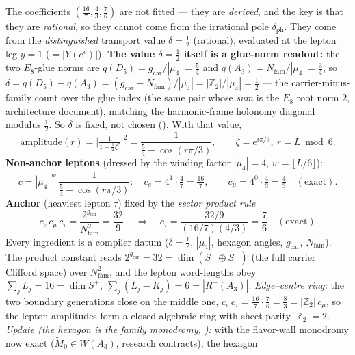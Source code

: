 \documentclass[11pt,a4paper]{article}
\newcommand{\gcar}{g_{\mathrm{car}}}
\newcommand{\Nfam}{N_{\mathrm{fam}}}
\newcommand{\Z}{\mathbb{Z}}
\theoremstyle{definition}
\begin{document}
\begin{keybox}[Where the lepton rationals come from: $\delta=\tfrac12$ resolvent $+$ product rule \mE]
The coefficients $(\tfrac{16}{7},\tfrac43,\tfrac76)$ are not fitted --- they are \emph{derived}, and the
key is that they are \emph{rational}, so they cannot come from the irrational pole $\delta_{\mathrm{ph}}$.
They come from the \emph{distinguished} transport value $\delta=\tfrac12$ (rational), evaluated at the
lepton leg $y=1$ ($=|Y(e^c)|$). \textbf{The value $\delta=\tfrac12$ itself is a glue-norm readout:} the two $E_8$-glue norms are
$q(D_5)=\gcar/|\mu_4|=\tfrac54$ and $q(A_3)=\Nfam/|\mu_4|=\tfrac34$, so
$\delta=q(D_5)-q(A_3)=(\gcar-\Nfam)/|\mu_4|=|\Z_2|/|\mu_4|=\tfrac12$ --- the carrier-minus-family count over
the glue index (the same pair whose \emph{sum} is the $E_8$ root norm $2$, architecture document), matching the
harmonic-frame holonomy diagonal modulus $\tfrac12$. So $\delta$ is fixed, not chosen
(). With that value,
\[
  \text{amplitude}(r)=\Big|\tfrac{1}{1-\tfrac12\zeta^{r}}\Big|^{2}=\frac{1}{\tfrac54-\cos(r\pi/3)},
  \qquad \zeta=e^{i\pi/3},\ r=L\bmod 6 .
\]
\textbf{Non-anchor leptons} (dressed by the winding factor $|\mu_4|=4$, $w=\lfloor L/6\rfloor$):
\[
  c=|\mu_4|^{\,w}\,\frac{1}{\tfrac54-\cos(r\pi/3)}:\quad
  c_e=4^{1}\!\cdot\!\tfrac{4}{7}=\tfrac{16}{7},\qquad
  c_\mu=4^{0}\!\cdot\!\tfrac{4}{3}=\tfrac{4}{3}\quad(\text{exact}).
\]
\textbf{Anchor} (heaviest lepton $\tau$) fixed by the \emph{sector product rule}
\[
  \boxed{\ c_e\,c_\mu\,c_\tau=\frac{2^{\gcar}}{\Nfam^{2}}=\frac{32}{9}\ }
  \quad\Longrightarrow\quad c_\tau=\frac{32/9}{(16/7)(4/3)}=\frac{7}{6}\quad(\text{exact}).
\]
Every ingredient is a compiler datum ($\delta{=}\tfrac12$, $|\mu_4|$, hexagon angles, $\gcar$, $\Nfam$).
The product constant reads $2^{\gcar}=32=\dim(S^+\!\oplus S^-)$ (the full carrier Clifford space) over
$\Nfam^2$, and the lepton word-lengths obey $\sum_j L_j=16=\dim S^+$, $\sum_j(L_j-K_j)=6=|R^+(A_3)|$.
\emph{Edge--centre ring:} the two boundary generations close on the middle one,
$c_e\,c_\tau=\tfrac{16}7\!\cdot\!\tfrac76=\tfrac83=|\Z_2|\,c_\mu$, so the lepton amplitudes form a closed
algebraic ring with sheet-parity $|\Z_2|=2$. \,\allowbreak{}\,\allowbreak{}
\smallskip\\
\noindent\emph{Update (the hexagon is the family monodromy, ):}
with the flavor-wall monodromy now exact ($\widetilde M_0\in W(A_3)$, research contracts), the hexagon

\end{keybox}
\end{document}
